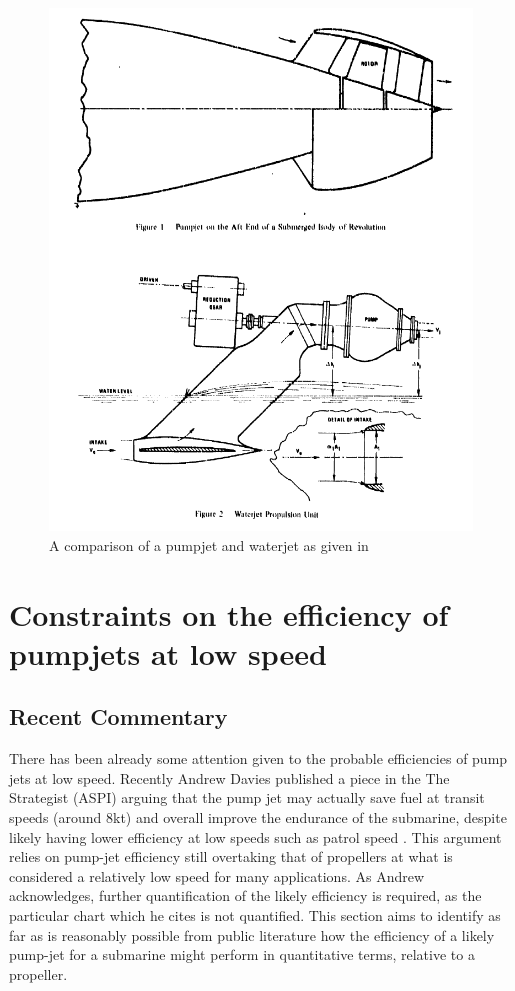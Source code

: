 \documentclass{article}\usepackage[]{graphicx}\usepackage[]{color}
\begin{document}
\begin{figure}
\includegraphics[width=\textwidth]{PumpjetWaterjet.png}
\caption{A comparison of a pumpjet and waterjet as given in \cite{wislicenus1973}}
\label{fig:PumpjetWaterjet.png}
\end{figure}


\section{Constraints on the efficiency of pumpjets at low speed}

\subsection{Recent Commentary}
There has been already some attention given to the probable efficiencies of pump jets at low speed. Recently Andrew Davies published a piece in the The Strategist (ASPI) arguing that the pump jet may actually save fuel at transit speeds (around 8kt) and overall improve the endurance of the submarine, despite likely having lower efficiency at low speeds such as patrol speed \parencite{davies2017}.  This argument relies on pump-jet efficiency still overtaking that of propellers at what is considered a relatively low speed for many applications.  As Andrew acknowledges, further quantification of the likely efficiency is required, as the particular chart which he cites is not quantified.  This section aims to identify as far as is reasonably possible from public literature how the efficiency of a likely pump-jet for a submarine might perform in quantitative terms, relative to a propeller.
\end{document}

